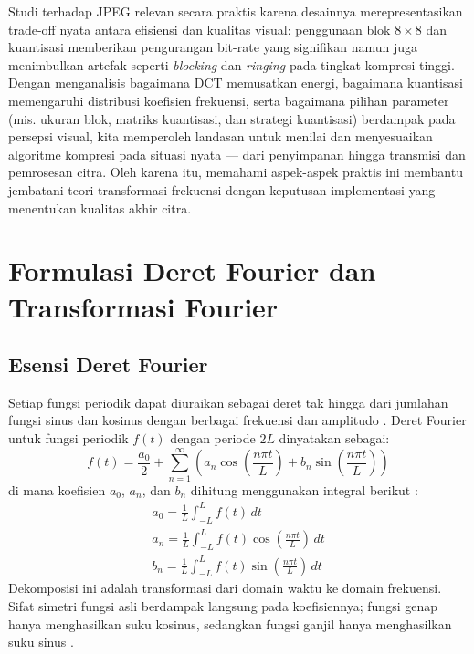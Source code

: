 \documentclass[a4paper]{article}
\begin{document}
Studi terhadap JPEG relevan secara praktis karena desainnya merepresentasikan trade-off nyata antara efisiensi dan kualitas visual: penggunaan blok $8\times 8$ dan kuantisasi memberikan pengurangan bit-rate yang signifikan namun juga menimbulkan artefak seperti \textit{blocking} dan \textit{ringing} pada tingkat kompresi tinggi. Dengan menganalisis bagaimana DCT memusatkan energi, bagaimana kuantisasi memengaruhi distribusi koefisien frekuensi, serta bagaimana pilihan parameter (mis. ukuran blok, matriks kuantisasi, dan strategi kuantisasi) berdampak pada persepsi visual, kita memperoleh landasan untuk menilai dan menyesuaikan algoritme kompresi pada situasi nyata — dari penyimpanan hingga transmisi dan pemrosesan citra. Oleh karena itu, memahami aspek-aspek praktis ini membantu jembatani teori transformasi frekuensi dengan keputusan implementasi yang menentukan kualitas akhir citra.

\section{Formulasi Deret Fourier dan Transformasi Fourier}
\subsection{Esensi Deret Fourier}
Setiap fungsi periodik dapat diuraikan sebagai deret tak hingga dari jumlahan fungsi sinus dan kosinus dengan berbagai frekuensi dan amplitudo \cite{bracewell1999fourier}. Deret Fourier untuk fungsi periodik $f(t)$ dengan periode $2L$ dinyatakan sebagai:
\begin{equation} \label{eq:fourier_series}
  f(t) = \frac{a_0}{2} + \sum_{n=1}^{\infty} \left( a_n \cos\left(\frac{n\pi t}{L}\right) + b_n \sin\left(\frac{n\pi t}{L}\right) \right)
\end{equation}
di mana koefisien $a_0$, $a_n$, dan $b_n$ dihitung menggunakan integral berikut \cite{oppenheim1996signals}:
\begin{gather}
  a_0 = \frac{1}{L} \int_{-L}^{L} f(t) \,dt \label{eq:a0} \\
  a_n = \frac{1}{L} \int_{-L}^{L} f(t) \cos\left(\frac{n\pi t}{L}\right) \,dt \label{eq:an} \\
  b_n = \frac{1}{L} \int_{-L}^{L} f(t) \sin\left(\frac{n\pi t}{L}\right) \,dt \label{eq:bn}
\end{gather}
Dekomposisi ini adalah transformasi dari domain waktu ke domain frekuensi. Sifat simetri fungsi asli berdampak langsung pada koefisiennya; fungsi genap hanya menghasilkan suku kosinus, sedangkan fungsi ganjil hanya menghasilkan suku sinus \cite{bracewell1999fourier}.
\end{document}
